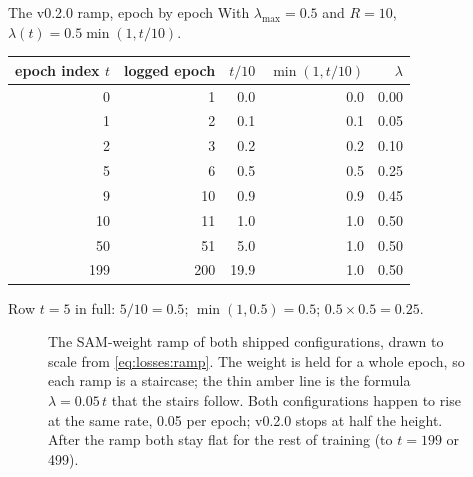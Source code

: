 \begin{worked}[label={we:losses:ramp}]{The v0.2.0 ramp, epoch by epoch}
With $\lambda_{\max} = 0.5$ and $R = 10$, $\lambda(t) = 0.5\min(1, t/10)$.
\begin{center}
\begin{tabular}{rrrrr}
\toprule
epoch index $t$ & logged epoch & $t/10$ & $\min(1, t/10)$ & $\lambda$\\
\midrule
0 & 1 & 0.0 & 0.0 & 0.00\\
1 & 2 & 0.1 & 0.1 & 0.05\\
2 & 3 & 0.2 & 0.2 & 0.10\\
5 & 6 & 0.5 & 0.5 & 0.25\\
9 & 10 & 0.9 & 0.9 & 0.45\\
10 & 11 & 1.0 & 1.0 & 0.50\\
50 & 51 & 5.0 & 1.0 & 0.50\\
199 & 200 & 19.9 & 1.0 & 0.50\\
\bottomrule
\end{tabular}
\end{center}
Row $t = 5$ in full: $5/10 = 0.5$; $\min(1, 0.5) = 0.5$; $0.5 \times 0.5 = 0.25$.
\end{worked}

\begin{figure}[htbp]
\centering
{}
\caption{The SAM-weight ramp of both shipped configurations, drawn to scale from
\cref{eq:losses:ramp}. The weight is held for a whole epoch, so each ramp is a staircase; the
thin amber line is the formula $\lambda = 0.05\,t$ that the stairs follow. Both configurations
happen to rise at the same rate, 0.05 per epoch; v0.2.0 stops at half the height. After the
ramp both stay flat for the rest of training (to $t = 199$ or 499).}
\label{fig:losses:ramp}
\end{figure}

